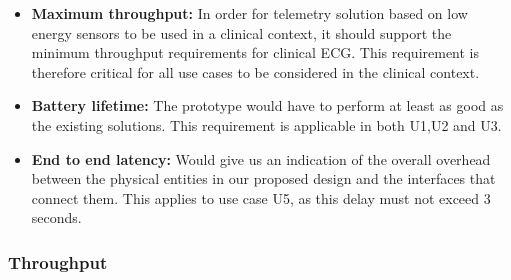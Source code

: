 \begin{itemize}
	\item \textbf{Maximum throughput:} In order for telemetry solution based on low energy sensors to be used in a clinical context, it should support the minimum throughput requirements for clinical ECG. This requirement is therefore critical for all use cases to be considered in the clinical context.
  	\item \textbf{Battery lifetime:} The prototype would have to perform at least as good as the existing solutions. This requirement is applicable in both U1,U2 and U3. 
  	\item \textbf{End to end latency:} Would give us an indication of the overall overhead between the physical entities in our proposed design and the interfaces that connect them. This applies to use case U5, as this delay must not exceed 3 seconds.
\end{itemize}
\noindent

\subsubsection{Throughput} %
\label{ssub:throughput}

